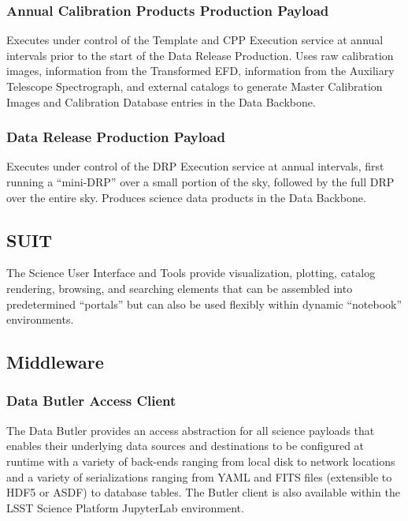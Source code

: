 \documentclass[]{article}
\begin{document}
\subsubsection{Annual Calibration Products Production
Payload}\label{annual-calibration-products-production-payload}

Executes under control of the Template and CPP Execution service at
annual intervals prior to the start of the Data Release Production. Uses
raw calibration images, information from the Transformed EFD,
information from the Auxiliary Telescope Spectrograph, and external
catalogs to generate Master Calibration Images and Calibration Database
entries in the Data Backbone.

\subsubsection{Data Release Production
Payload}\label{data-release-production-payload}

Executes under control of the DRP Execution service at annual intervals,
first running a ``mini-DRP'' over a small portion of the sky, followed
by the full DRP over the entire sky. Produces science data products in
the Data Backbone.

\subsection{SUIT}\label{suit}

The Science User Interface and Tools provide visualization, plotting,
catalog rendering, browsing, and searching elements that can be
assembled into predetermined ``portals'' but can also be used flexibly
within dynamic ``notebook'' environments.

\subsection{Middleware}\label{middleware}

\subsubsection{Data Butler Access
Client}\label{data-butler-access-client}

The Data Butler provides an access abstraction for all science payloads
that enables their underlying data sources and destinations to be
configured at runtime with a variety of back-ends ranging from local
disk to network locations and a variety of serializations ranging from
YAML and FITS files (extensible to HDF5 or ASDF) to database tables. The
Butler client is also available within the LSST Science Platform
JupyterLab environment.
\end{document}
